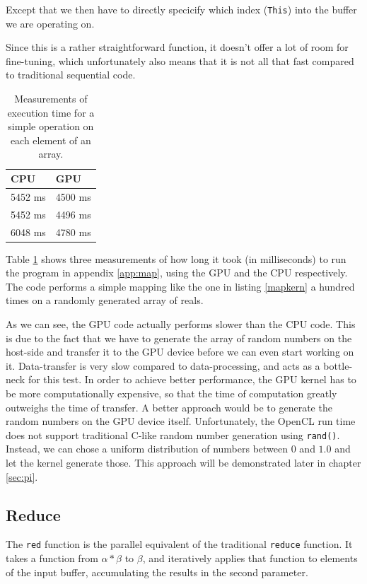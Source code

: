 Except that we then have to directly specicify which index
(\texttt{This}) into the buffer we are operating on.

Since this is a rather straightforward function, it doesn't offer a
lot of room for fine-tuning, which unfortunately also means that it is
not all that fast compared to traditional sequential code.

\begin{table}
  \center
  \label{maptable}
  \begin{tabular}{l|l}
    CPU  & GPU  \\ \hline
    5452 ms & 4500 ms \\ \hline
    5452 ms & 4496 ms \\ \hline
    6048 ms & 4780 ms \\ \hline
  \end{tabular}
  \caption{Measurements of execution time for a simple operation on
    each element of an array.}
\end{table}

Table \ref{maptable} shows three measurements of how long it took (in
milliseconds) to run the program in appendix \ref{app:map}, using the
GPU and the CPU respectively. The code performs a simple mapping like
the one in listing \ref{mapkern} a hundred times on a randomly
generated array of reals.

As we can see, the GPU code actually performs slower than the CPU
code. This is due to the fact that we have to generate the array of
random numbers on the host-side and transfer it to the GPU device
before we can even start working on it. Data-transfer is very slow
compared to data-processing, and acts as a bottle-neck for this
test. In order to achieve better performance, the GPU kernel has to be
more computationally expensive, so that the time of computation
greatly outweighs the time of transfer. A better approach would be to
generate the random numbers on the GPU device itself. Unfortunately,
the OpenCL run time does not support traditional C-like random number
generation using \texttt{rand()}. Instead, we can chose a uniform
distribution of numbers between $0$ and $1.0$ and let the kernel
generate those. This approach will be demonstrated later in chapter
\ref{sec:pi}.

\subsection{Reduce}

The \texttt{red} function is the parallel equivalent of the
traditional \texttt{reduce} function. It takes a function from $\alpha
* \beta$ to $\beta$, and iteratively applies that function to elements
of the input buffer, accumulating the results in the second parameter.

